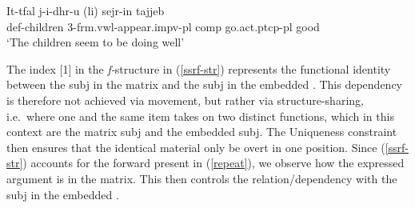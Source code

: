 \documentclass[output=paper]{LSP/langsci}
\begin{document}
\ea \label{repeat}
\gll It-tfal j-i-dhr-u (li) sejr-in tajjeb\\
{\sc def-}children 3-{\sc frm.vwl}-appear.{\sc impv-pl} {\sc comp} go.{\sc act.ptcp-pl} good\\
\glt `The children seem to be doing well'
\z 

\ea
\label{ssrf-str}
\z

The index [1] in the \emph{f-}structure in (\ref{ssrf-str}) represents the functional identity between the {\sc subj} in the matrix and the {\sc subj} in the embedded . This dependency is therefore not achieved via movement, but rather via structure-sharing, i.e.~where one and the same  item takes on two distinct functions, which in this context are the matrix {\sc subj} and the embedded {\sc subj}. The Uniqueness constraint then ensures that the identical material only be overt in one position. Since (\ref{ssrf-str}) accounts for the forward  present in (\ref{repeat}), we observe how the expressed argument is in the matrix. This then controls the relation/dependency with the {\sc subj} in the embedded .
\end{document}

